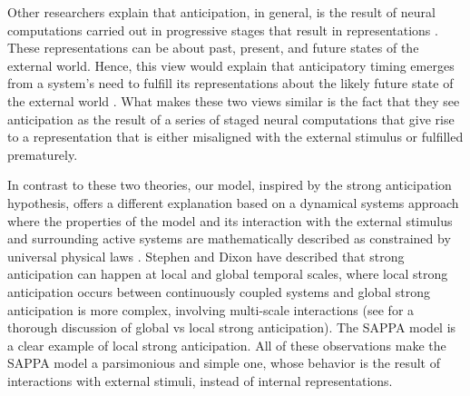 \documentclass{report}
\begin{document}
Other researchers explain that anticipation, in general, is the result of neural computations carried out in progressive stages that result in representations \cite{clark2008brain}. These representations can be about past, present, and future states of the external world. Hence, this view would explain that anticipatory timing emerges from a system's need to fulfill its representations about the likely future state of the external world \cite{pezzulo2008coordinating}. What makes these two views similar is the fact that they see anticipation as the result of a series of staged neural computations that give rise to a representation that is either misaligned with the external stimulus or fulfilled prematurely.

In contrast to these two theories, our model, inspired by the strong anticipation hypothesis, offers a different explanation based on a dynamical systems approach where the properties of the model and its interaction with the external stimulus and surrounding active systems are mathematically described as constrained by universal physical laws \cite{stepp2010strong}. Stephen and Dixon \cite{stephen2011strong} have described that strong anticipation can happen at local and global temporal scales, where local strong anticipation occurs between continuously coupled systems and global strong anticipation is more complex, involving multi-scale interactions (see \cite{mahmoodi2020dynamical, roume2018windowed} for a thorough discussion of global vs local strong anticipation). The SAPPA model is a clear example of local strong anticipation. All of these observations make the SAPPA model a parsimonious and simple one, whose behavior is the result of interactions with external stimuli, instead of internal representations.
\end{document}

